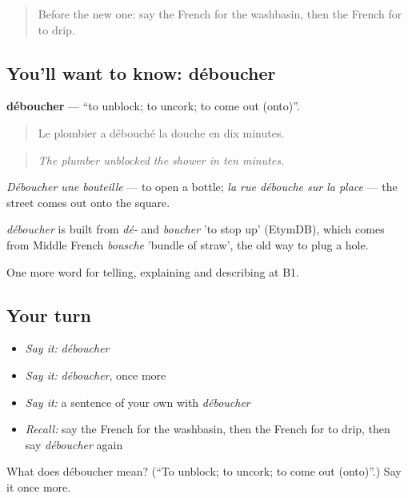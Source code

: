 \label{lesson:FR-C428-deboucher}



\begin{quote}
Before the new one: say the French for the washbasin, then the French for to drip.
\end{quote}

\subsection*{You'll want to know: déboucher}
\textbf{déboucher} — \textquotedblleft{}to unblock; to uncork; to come out (onto)\textquotedblright{}.

\begin{quote}
Le plombier a débouché la douche en dix minutes.
\end{quote}

\begin{quote}
\emph{The plumber unblocked the shower in ten minutes.}
\end{quote}

\emph{Déboucher une bouteille} — to open a bottle; \emph{la rue débouche sur la place} — the street comes out onto the square.

\begin{cousinweb}
\emph{déboucher} is built from \emph{dé-} and \emph{boucher} 'to stop up' (EtymDB), which comes from Middle French \emph{bousche} 'bundle of straw', the old way to plug a hole.
\end{cousinweb}

\begin{grammarlens}[title={What you've built}]
One more word for telling, explaining and describing at B1.
\end{grammarlens}

\subsection*{Your turn}
\begin{itemize}
\raggedright
  \item \emph{Say it:} \emph{déboucher}
  \item \emph{Say it:} \emph{déboucher}, once more
  \item \emph{Say it:} a sentence of your own with \emph{déboucher}
  \item \emph{Recall:} say the French for the washbasin, then the French for to drip, then say \emph{déboucher} again
\end{itemize}

\begin{tcolorbox}[breakable,colback=teal!4,colframe=teal!35!black,title={Before you move on}]
What does déboucher mean? (\textquotedblleft{}To unblock; to uncork; to come out (onto)\textquotedblright{}.) Say it once more.
\end{tcolorbox}

